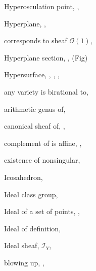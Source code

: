 {{\noindent\hspace*{0.0bp}Hyperosculation point, , \par
\noindent\hspace*{0.0bp}Hyperplane, , \par
\noindent\hspace*{7.5bp}corresponds to sheaf $\mathcal O(1)$, \par
\noindent\hspace*{0.0bp}Hyperplane section, ,  (Fig)\par
\noindent\hspace*{0.0bp}Hypersurface, , , , \par
\noindent\hspace*{7.5bp}any variety is birational to, \par
\noindent\hspace*{7.5bp}arithmetic genus of, \par
\noindent\hspace*{7.5bp}canonical sheaf of, , \par
\noindent\hspace*{7.5bp}complement of is affine, , \par
\noindent\hspace*{7.5bp}existence of nonsingular, \par
\vspace{8.55bp}
\noindent\hspace*{0.0bp}Icosahedron, \par
\noindent\hspace*{0.0bp}Ideal class group, \par
}\hfill%
\parbox[t]{162.5bp}{\fontsize{8.05}{8.49}\selectfont%
\raggedright\setlength{\parskip}{0pt}%
\noindent\hspace*{0.0bp}Ideal of a set of points, , \par
\noindent\hspace*{0.0bp}Ideal of definition, \par
\noindent\hspace*{0.0bp}Ideal sheaf, $\mathcal I_Y$, \par
\noindent\hspace*{7.5bp}blowing up, , \par
}}
